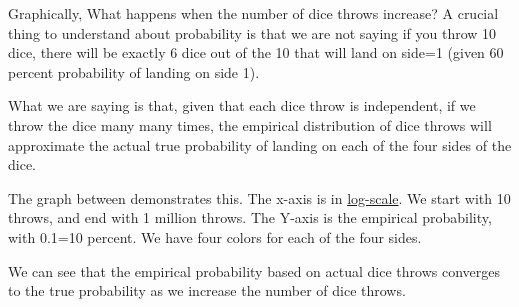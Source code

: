\documentclass[
]{book}
\begin{document}
Graphically, What happens when the number of dice throws increase? A crucial thing to understand about probability is that we are not saying if you throw 10 dice, there will be exactly 6 dice out of the 10 that will land on side=1 (given 60 percent probability of landing on side 1).

What we are saying is that, given that each dice throw is independent, if we throw the dice many many times, the empirical distribution of dice throws will approximate the actual true probability of landing on each of the four sides of the dice.

The graph between demonstrates this. The x-axis is in \href{https://en.wikipedia.org/wiki/Logarithmic_scale}{log-scale}. We start with 10 throws, and end with 1 million throws. The Y-axis is the empirical probability, with 0.1=10 percent. We have four colors for each of the four sides.

We can see that the empirical probability based on actual dice throws converges to the true probability as we increase the number of dice throws.
\end{document}
